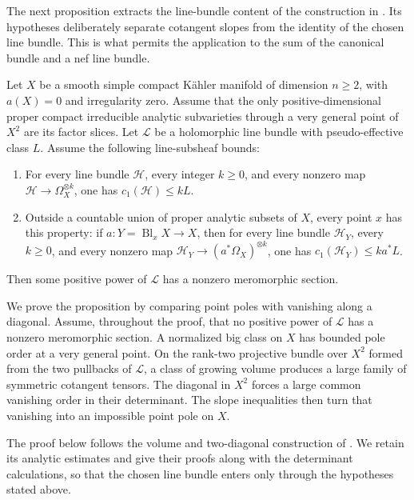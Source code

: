 The next proposition extracts the line-bundle content of the
construction in \cite[Section~6]{K}.  Its hypotheses deliberately separate
cotangent slopes from the identity of the chosen line bundle.  This is
what permits the application to the sum of the canonical bundle and a
nef line bundle.

\begin{proposition}\label{zero:line-nonvanishing}
Let \(X\) be a smooth simple compact Kähler manifold of dimension
\(n\ge2\), with \(a(X)=0\) and irregularity zero.  Assume that the only
positive-dimensional proper compact irreducible analytic subvarieties
through a very general point of \(X^2\) are its factor slices.
Let \(\mathscr L\) be a holomorphic line bundle with pseudo-effective
class \(L\).  Assume the following line-subsheaf bounds:
\begin{enumerate}
\item For every line bundle \(\mathscr H\), every integer \(k\ge0\),
and every nonzero map \(\mathscr H\to\Omega_X^{\otimes k}\), one has
\(c_1(\mathscr H)\le kL\).
\item Outside a countable union of proper analytic subsets of \(X\),
every point \(x\) has this property: if
\(a:Y=\operatorname{Bl}_xX\to X\), then for every line bundle
\(\mathscr H_Y\), every \(k\ge0\), and every nonzero map
\(\mathscr H_Y\to(a^*\Omega_X)^{\otimes k}\), one has
\(c_1(\mathscr H_Y)\le ka^*L\).
\end{enumerate}
Then some positive power of \(\mathscr L\) has a nonzero meromorphic
section.
\end{proposition}

We prove the proposition by comparing point poles with vanishing along
a diagonal.  Assume, throughout the proof, that no positive power of
\(\mathscr L\) has a nonzero meromorphic section.  A normalized big class
on \(X\) has bounded pole order at a very general point.  On the rank-two projective bundle over \(X^2\) formed from the two
pullbacks of \(\mathscr L\), a class of growing volume produces a
large family of symmetric cotangent tensors.
The diagonal in \(X^2\) forces a large common vanishing order in
their determinant.  The slope inequalities then turn that vanishing into an
impossible point pole on \(X\).

The proof below follows the volume and two-diagonal construction of
\cite[results~6.3--6.10]{K}.  We retain its analytic estimates and give
their proofs along with the determinant calculations, so that the
chosen line bundle enters only through the hypotheses stated above.

